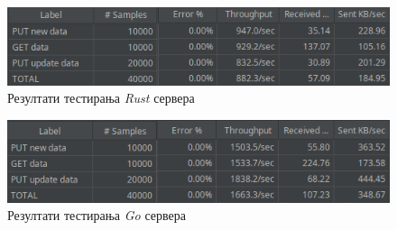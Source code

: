 \begin{figure}[H]
    \centering
    \includegraphics[width=1\textwidth]{images/stress_test_rust.png}
    \caption{Резултати тестирања \textit{Rust} сервера}
    \label{fig:stress_rust}
\end{figure}

\begin{figure}[H]
    \centering
    \includegraphics[width=1\textwidth]{images/stress_test_go.png}
    \caption{Резултати тестирања \textit{Go} сервера}
    \label{fig:stress_go}
\end{figure}